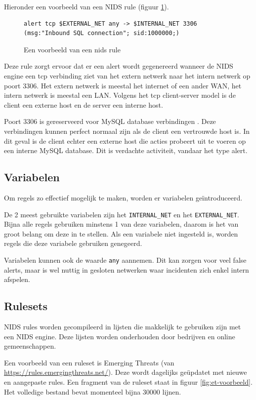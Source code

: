 \documentclass[a4paper,12pt]{report}
\begin{document}
Hieronder een voorbeeld van een NIDS rule (figuur \ref{fig:nids-rule}).

\begin{figure}[H]
  \begin{lstlisting}
alert tcp $EXTERNAL_NET any -> $INTERNAL_NET 3306 (msg:"Inbound SQL connection"; sid:1000000;)
  \end{lstlisting}
  \caption{Een voorbeeld van een nids rule}
  \label{fig:nids-rule}
\end{figure}

Deze rule zorgt ervoor dat er een alert wordt gegenereerd wanneer de NIDS engine een tcp verbinding ziet van het extern netwerk naar het intern netwerk op poort 3306.
Het extern netwerk is meestal het internet of een ander WAN, het intern netwerk is meestal een LAN.
Volgens het tcp client-server model is de client een externe host en de server een interne host.

Poort 3306 is gereserveerd voor MySQL database verbindingen \autocite{iana:ports}.
Deze verbindingen kunnen perfect normaal zijn als de client een vertrouwde host is.
In dit geval is de client echter een externe host die acties probeert uit te voeren op een interne MySQL database.
Dit is verdachte activiteit, vandaar het type alert.

\subsection{Variabelen}
Om regels zo effectief mogelijk te maken, worden er variabelen geïntroduceerd.

De 2 meest gebruikte variabelen zijn het \lstinline|INTERNAL_NET| en het \lstinline|EXTERNAL_NET|.
Bijna alle regels gebruiken minstens 1 van deze variabelen, daarom is het van groot belang om deze in te stellen.
Als een variabele niet ingesteld is, worden regels die deze variabele gebruiken genegeerd.

Variabelen kunnen ook de waarde \lstinline|any| aannemen.
Dit kan zorgen voor veel false alerts, maar is wel nuttig in gesloten netwerken waar incidenten zich enkel intern afspelen.

\subsection{Rulesets}
NIDS rules worden gecompileerd in lijsten die makkelijk te gebruiken zijn met een NIDS engine.
Deze lijsten worden onderhouden door bedrijven en online gemeenschappen.

Een voorbeeld van een ruleset is Emerging Threats (van \url{https://rules.emergingthreats.net/}).
Deze wordt dagelijks geüpdatet met nieuwe en aangepaste rules.
Een fragment van de ruleset staat in figuur \ref{fig:et-voorbeeld}.
Het volledige bestand bevat momenteel bijna $30000$ lijnen.
\end{document}
